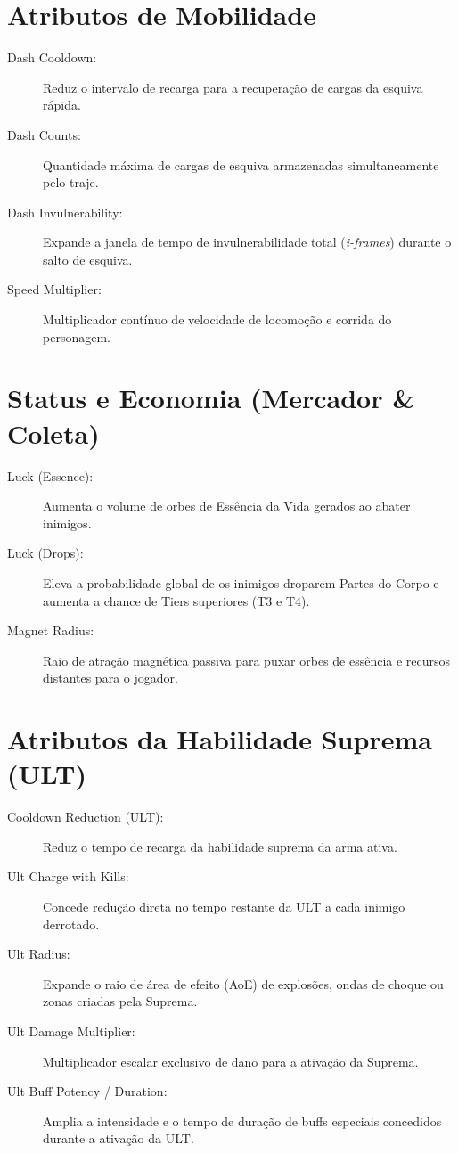 \documentclass[a4paper,12pt]{report}
\begin{document}
\section{Atributos de Mobilidade}
\begin{description}
    \item[Dash Cooldown:] Reduz o intervalo de recarga para a recuperação de cargas da esquiva rápida.
    \item[Dash Counts:] Quantidade máxima de cargas de esquiva armazenadas simultaneamente pelo traje.
    \item[Dash Invulnerability:] Expande a janela de tempo de invulnerabilidade total (\textit{i-frames}) durante o salto de esquiva.
    \item[Speed Multiplier:] Multiplicador contínuo de velocidade de locomoção e corrida do personagem.
\end{description}

\section{Status e Economia (Mercador \& Coleta)}
\begin{description}
    \item[Luck (Essence):] Aumenta o volume de orbes de Essência da Vida gerados ao abater inimigos.
    \item[Luck (Drops):] Eleva a probabilidade global de os inimigos droparem Partes do Corpo e aumenta a chance de Tiers superiores (T3 e T4).
    \item[Magnet Radius:] Raio de atração magnética passiva para puxar orbes de essência e recursos distantes para o jogador.
\end{description}

\section{Atributos da Habilidade Suprema (ULT)}
\begin{description}
    \item[Cooldown Reduction (ULT):] Reduz o tempo de recarga da habilidade suprema da arma ativa.
    \item[Ult Charge with Kills:] Concede redução direta no tempo restante da ULT a cada inimigo derrotado.
    \item[Ult Radius:] Expande o raio de área de efeito (AoE) de explosões, ondas de choque ou zonas criadas pela Suprema.
    \item[Ult Damage Multiplier:] Multiplicador escalar exclusivo de dano para a ativação da Suprema.
    \item[Ult Buff Potency / Duration:] Amplia a intensidade e o tempo de duração de buffs especiais concedidos durante a ativação da ULT.
\end{description}
\end{document}
